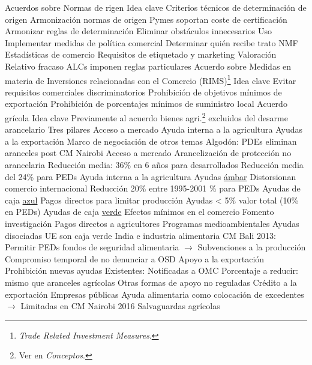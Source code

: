 \documentclass{nuevotema}
\begin{document}
\begin{esquemal}
		\2 Acuerdos sobre Normas de rigen
			\3 Idea clave
				\4 Criterios técnicos de determinación de origen
				\4 Armonización normas de origen
				\4 Pymes soportan coste de certificación
				\4 Armonizar reglas de determinación
				\4[] Eliminar obstáculos innecesarios
			\3 Uso
				\4 Implementar medidas de política comercial
				\4 Determinar quién recibe trato NMF
				\4 Estadísticas de comercio
				\4 Requisitos de etiquetado y marketing
			\3 Valoración
				\4 Relativo fracaso
				\4 ALCs imponen reglas particulares
		\2 Acuerdo sobre Medidas en materia de Inversiones relacionadas con el Comercio (RIMS)\footnote{\textit{Trade Related Investment Measures}.}
			\3 Idea clave
				\4 Evitar requisitos comerciales discriminatorios
				\4 Prohibición de objetivos mínimos de exportación
				\4 Prohibición de porcentajes mínimos de suministro local
		\2 Acuerdo grícola
			\3 Idea clave
				\4 Previamente al acuerdo
				\4[$\to$] bienes agri.\footnote{Ver en \textit{Conceptos}.} excluidos del desarme arancelario
				\4 Tres pilares
				\4[] Acceso a mercado
				\4[] Ayuda interna a la agricultura
				\4[] Ayudas a la exportación
				\4 Marco de negociación de otros temas
				\4[] Algodón: PDEs eliminan aranceles post CM Nairobi
			\3 Acceso a mercado
				\4 Arancelización de protección no arancelaria
				\4 Reducción media: 36\% en 6 años para desarrollados
				\4 Reducción media del 24\% para PEDs
			\3 Ayuda interna a la agricultura
				\4 Ayudas \underline{ámbar}
				\4[] Distorsionan comercio internacional
				\4[] Reducción 20\% entre 1995-2001
				\% para PEDs
				\4 Ayudas de caja \underline{azul}
				\4[] Pagos directos para limitar producción
				\4[] Ayudas < 5\% valor total (10\% en PEDs)
				\4 Ayudas de caja \underline{verde}
				\4[] Efectos mínimos en el comercio
				\4[] Fomento investigación
				\4[] Pagos directos a agricultores
				\4[] Programas medioambientales
				\4[] Ayudas disociadas UE son caja verde
				\4 India e industria alimentaria
				\4[] CM Bali 2013:
				\4[] Permitir PEDs fondos de seguridad alimentaria
				\4[] $\to$ Subvenciones a la producción
				\4[] Compromiso temporal de no denunciar a OSD
			\3 Apoyo a la exportación
				\4 Prohibición nuevas ayudas
				\4 Existentes:
				\4[] Notificadas a OMC
				\4[] Porcentaje a reducir: mismo que aranceles agrícolas
				\4 Otras formas de apoyo no reguladas
				\4[] Crédito a la exportación
				\4[] Empresas públicas
				\4[] Ayuda alimentaria como colocación de excedentes
				\4[] $\to$ Limitadas en CM Nairobi 2016
			\3 Salvaguardas agrícolas

\end{esquemal}
\end{document}
